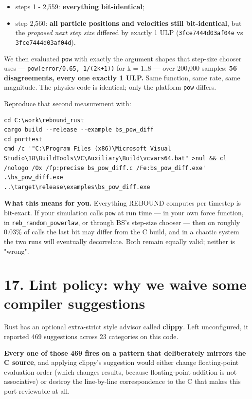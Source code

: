 \documentclass[11pt]{article}
\begin{document}
\begin{itemize}
\item steps 1 - 2,559: \textbf{everything bit-identical};
\item step 2,560: \textbf{all particle positions and velocities still bit-identical}, but the \emph{proposed next step size} differed by exactly 1 ULP (\texttt{3fce7444d03af04e} vs \texttt{3fce7444d03af04d}).
\end{itemize}

We then evaluated \texttt{pow} with exactly the argument shapes that step-size chooser uses --- \texttt{pow(error/0.65, 1/(2k+1))} for k = 1..8 --- over 200,000 samples: \textbf{56 disagreements, every one exactly 1 ULP.} Same function, same rate, same magnitude. The physics code is identical; only the platform \texttt{pow} differs.

Reproduce that second measurement with:

\begin{lstlisting}
cd C:\work\rebound_rust
cargo build --release --example bs_pow_diff
cd porttest
cmd /c '"C:\Program Files (x86)\Microsoft Visual Studio\18\BuildTools\VC\Auxiliary\Build\vcvars64.bat" >nul && cl /nologo /Ox /fp:precise bs_pow_diff.c /Fe:bs_pow_diff.exe'
.\bs_pow_diff.exe
..\target\release\examples\bs_pow_diff.exe
\end{lstlisting}

\textbf{What this means for you.} Everything REBOUND computes per timestep is bit-exact. If your simulation calls \texttt{pow} at run time --- in your own force function, in \texttt{reb\_random\_powerlaw}, or through BS's step-size chooser --- then on roughly 0.03\% of calls the last bit may differ from the C build, and in a chaotic system the two runs will eventually decorrelate. Both remain equally valid; neither is "wrong".

\section{17. Lint policy: why we waive some compiler suggestions}

Rust has an optional extra-strict style advisor called \textbf{clippy}. Left unconfigured, it reported 469 suggestions across 23 categories on this code.

\textbf{Every one of those 469 fires on a pattern that deliberately mirrors the C source}, and applying clippy's suggestion would either change floating-point evaluation order (which changes results, because floating-point addition is not associative) or destroy the line-by-line correspondence to the C that makes this port reviewable at all.
\end{document}
